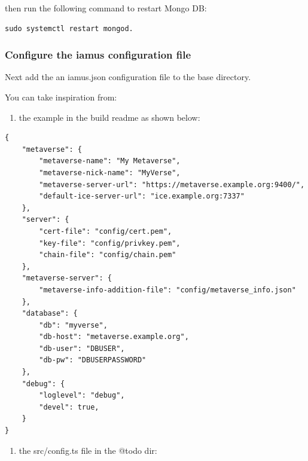 then run the following command to restart Mongo DB:

\begin{verbatim}
sudo systemctl restart mongod.
\end{verbatim}

\hypertarget{configure-the-iamus-configuration-file}{%
\subsubsection{Configure the iamus configuration
file}\label{configure-the-iamus-configuration-file}}

Next add the an iamus.json configuration file to the base directory.

You can take inspiration from:

\begin{enumerate}
\def\labelenumi{\arabic{enumi})}
\tightlist
\item
  the example in the build readme as shown below:
\end{enumerate}

\begin{verbatim}
{
    "metaverse": {
        "metaverse-name": "My Metaverse",
        "metaverse-nick-name": "MyVerse",
        "metaverse-server-url": "https://metaverse.example.org:9400/",
        "default-ice-server-url": "ice.example.org:7337"
    },
    "server": {
        "cert-file": "config/cert.pem",
        "key-file": "config/privkey.pem",
        "chain-file": "config/chain.pem"
    },
    "metaverse-server": {
        "metaverse-info-addition-file": "config/metaverse_info.json"
    },
    "database": {
        "db": "myverse",
        "db-host": "metaverse.example.org",
        "db-user": "DBUSER",
        "db-pw": "DBUSERPASSWORD"
    },
    "debug": {
        "loglevel": "debug",
        "devel": true,
    }
}
\end{verbatim}

\begin{enumerate}
\def\labelenumi{\arabic{enumi})}
\setcounter{enumi}{1}
\tightlist
\item
  the src/config.ts file in the @todo dir:
\end{enumerate}


